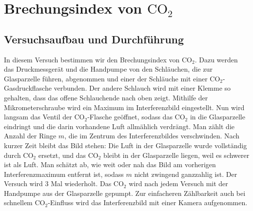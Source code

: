\documentclass[12pt,a4paper]{article}
\begin{document}
\section{Brechungsindex von $\text{CO}_2$}
\subsection{Versuchsaufbau und Durchführung}
In diesem Versuch bestimmen wir den Brechungsindex von CO$_2$. Dazu werden das Druckmessgerät und die Handpumpe von den Schläuchen, die zur Glasparzelle führen, abgenommen und einer der Schläuche mit einer CO$_2$-Gasdruckflasche verbunden. Der andere Schlauch wird mit einer Klemme so gehalten, dass das offene Schlauchende nach oben zeigt. Mithilfe der Mikrometerschraube wird ein Maximum im Interferenzbild eingestellt. Nun wird langsam das Ventil der CO$_2$-Flasche geöffnet, sodass das CO$_2$ in die Glasparzelle eindringt und die darin vorhandene Luft allmählich verdrängt. Man zählt die Anzahl der Ringe $m$, die im Zentrum des Interferenzbildes verschwinden. Nach kurzer Zeit bleibt das Bild stehen: Die Luft in der Glasparzelle wurde vollständig durch CO$_2$ ersetzt, und das CO$_2$ bleibt in der Glasparzelle liegen, weil es schwerer ist als Luft. Man schätzt ab, wie weit oder nah das Bild am vorherigen Interferenzmaximum entfernt ist, sodass $m$ nicht zwingend ganzzahlig ist. Der Versuch wird 3 Mal wiederholt. Das CO$_2$ wird nach jedem Versuch mit der Handpumpe aus der Glasparzelle gepumpt. Zur einfacheren Zählbarkeit auch bei schnellem CO$_2$-Einfluss wird das Interferenzbild mit einer Kamera aufgenommen.
\end{document}
